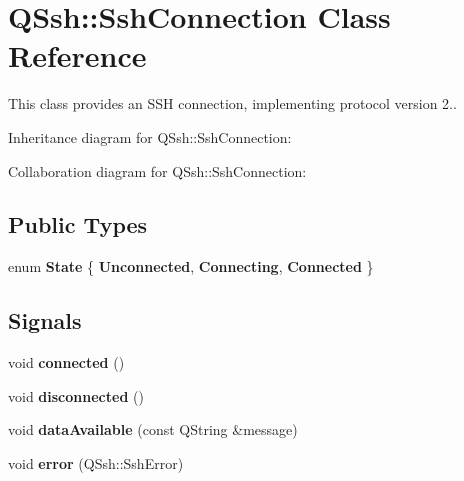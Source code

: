 \hypertarget{class_q_ssh_1_1_ssh_connection}{}\section{Q\+Ssh\+:\+:Ssh\+Connection Class Reference}
\label{class_q_ssh_1_1_ssh_connection}


This class provides an S\+SH connection, implementing protocol version 2..  




Inheritance diagram for Q\+Ssh\+:\+:Ssh\+Connection\+:


Collaboration diagram for Q\+Ssh\+:\+:Ssh\+Connection\+:
\subsection*{Public Types}
\begin{DoxyCompactItemize}
\item 
\mbox{\label{class_q_ssh_1_1_ssh_connection_a06afc077a128acc770fb462c0412d7fc}} 
enum {\bfseries State} \{ {\bfseries Unconnected}, 
{\bfseries Connecting}, 
{\bfseries Connected}
 \}
\end{DoxyCompactItemize}
\subsection*{Signals}
\begin{DoxyCompactItemize}
\item 
\mbox{\label{class_q_ssh_1_1_ssh_connection_ae57d736dc7c32e51638cbd703981f06f}} 
void {\bfseries connected} ()
\item 
\mbox{\label{class_q_ssh_1_1_ssh_connection_a4612a8cc7cd271d1a411092ad142e9b2}} 
void {\bfseries disconnected} ()
\item 
\mbox{\label{class_q_ssh_1_1_ssh_connection_a5fe33f1f0ba7260d9bb6c279d9a8c2f1}} 
void {\bfseries data\+Available} (const Q\+String \&message)
\item 
\mbox{\label{class_q_ssh_1_1_ssh_connection_a275bc4be07e4799f1c8123493071cad6}} 
void {\bfseries error} (Q\+Ssh\+::\+Ssh\+Error)
\end{DoxyCompactItemize}
